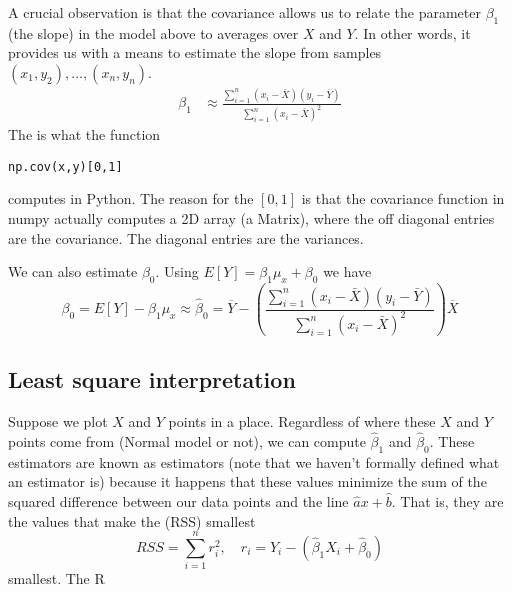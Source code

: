 %    


A crucial observation is that the covariance allows us to relate the parameter $\beta_1$ (the slope) in the model above to averages over $X$ and $Y$. In other words, it provides us with a means to estimate the slope from samples $(x_1,y_2),\dots,(x_n,y_n)$. 
\begin{align*}
 \beta_1 &\approx  \frac{\sum_{i=1}^n\left(x_i - \bar{X}\right)\left(y_i-\bar{Y}\right)}{\sum_{i=1}^n\left(x_i - \bar{X}\right)^2}
\end{align*}
The is what the function 
\begin{Verbatim}
np.cov(x,y)[0,1]
\end{Verbatim}
computes in Python. 
The reason for the $[0,1]$ is that the covariance function in numpy actually computes a 2D array (a Matrix), where the off diagonal entries are the covariance. The diagonal entries are the variances. 

We can also estimate $\beta_0$. Using $E[Y] = \beta_1 \mu_x + \beta_0$ we have
\begin{equation*}
\beta_0 =  E[Y]  - \beta_1 \mu_x \approx \hat{\beta}_0 =  \overline{Y} - \left(\frac{\sum_{i=1}^n\left(x_i - \bar{X}\right)\left(y_i-\bar{Y}\right)}{\sum_{i=1}^n\left(x_i - \bar{X}\right)^2}\right)\overline{X}
\end{equation*}



\subsection{Least square interpretation}
 Suppose we plot $X$  and $Y$ points in a place. Regardless of where these $X$ and $Y$ points come from (Normal model or not), we can compute $\hat{\beta}_1$ and $\hat{\beta}_0$. 
These estimators are known as  estimators (note that we haven't formally defined what an estimator is) because  it happens that these values minimize the sum of the squared difference between our data points and the line $\hat{a}x + \hat{b}$. That is, they are the values that make the (RSS) smallest
\begin{equation*}
RSS = \sum_{i=1}^n r_i^2,\quad r_i  = Y_i - (\hat{\beta}_1X_i + \hat{\beta}_0)
\end{equation*}
smallest. The R


